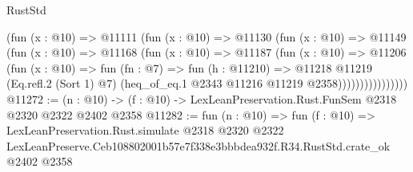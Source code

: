 \begin{lexlean}{RustStd}
\begin{coremodule}
                    (fun (x : @10) =>
                    @11111
                      (fun (x : @10) =>
                      @11130
                        (fun (x : @10) =>
                        @11149
                          (fun (x : @10) =>
                          @11168
                            (fun (x : @10) =>
                            @11187
                              (fun (x : @10) =>
                              @11206
                                (fun (x : @10) =>
                                fun (fn : @7) =>
                                fun (h : @11210) =>
                                @11218
                                  @11219
                                  (Eq.refl.{2} (Sort 1) @7)
                                  (heq_of_eq.{1} @2343 @11216 @11219 @2358))))))))))))))))
@11272 := (n : @10) -> (f : @10) -> LexLeanPreservation.Rust.FunSem @2318 @2320 @2322 @2402 @2358
@11282 := fun (n : @10) =>
  fun (f : @10) =>
  LexLeanPreservation.Rust.simulate
    @2318
    @2320
    @2322
    LexLeanPreserve.Ceb108802001b57e7f338e3bbbdea932f.R34.RustStd.crate_ok
    @2402
    @2358
\end{coremodule}
\end{lexlean}
